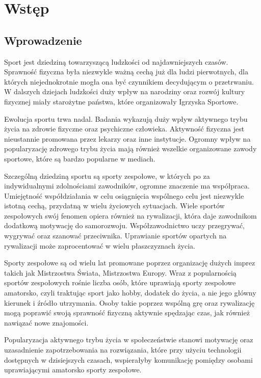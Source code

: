 \chapter{Wstęp}
\section{Wprowadzenie}

Sport jest dziedziną towarzyszącą ludzkości od najdawniejszych czasów. Sprawność fizyczna była niezwykle ważną cechą już dla ludzi pierwotnych, dla których niejednokrotnie mogła ona być czynnikiem decydującym o przetrwaniu. W dalszych dziejach ludzkości duży wpływ na narodziny oraz rozwój kultury fizycznej miały starożytne państwa, które organizowały Igrzyska Sportowe.

Ewolucja sportu trwa nadal. Badania wykazują duży wpływ aktywnego trybu życia na zdrowie fizyczne oraz psychiczne człowieka. Aktywność fizyczna jest nieustannie promowana przez lekarzy oraz inne instytucje. Ogromny wpływ na popularyzację zdrowego trybu życia mają również wszelkie organizowane zawody sportowe, które są bardzo popularne w mediach.

Szczególną dziedziną sportu są sporty zespołowe, w których po za indywidualnymi zdolnościami zawodników, ogromne znaczenie ma współpraca. Umiejętność współdziałania w celu osiągnięcia wspólnego celu jest niezwykle istotną cechą, przydatną w wielu życiowych sytuacjach. Wiele sportów zespołowych swój fenomen opiera również na rywalizacji, która daje zawodnikom dodatkową motywację do samorozwoju. Współzawodnictwo uczy przegrywać, wygrywać oraz szanować przeciwnika. Uprawianie sportów opartych na rywalizacji może zaprocentować w wielu płaszczyznach życia.

Sporty zespołowe są od wielu lat promowane poprzez organizację dużych imprez takich jak Mistrzostwa Świata, Mistrzostwa Europy. Wraz z popularnością sportów zespołowych rośnie liczba osób, które uprawiają sporty zespołowe amatorsko, czyli traktując sport jako hobby, dodatek do życia, a nie jego główny kierunek i źródło utrzymania. Osoby takie poprzez wspólną grę oraz rywalizację mogą poprawić swoją sprawność fizyczną aktywnie spędzając czas, jak również nawiązać nowe znajomości. 

Popularyzacja aktywnego trybu życia w społeczeństwie stanowi motywację oraz uzasadnienie zapotrzebowania na rozwiązania, które przy użyciu technologii dostępnych w dzisiejszych czasach, wspierałyby komunikację pomiędzy osobami uprawiającymi amatorsko sporty zespołowe. 

